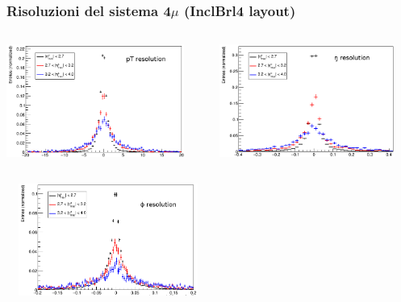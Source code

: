 \documentclass{beamer}
\begin{document}
\begin{frame}
\frametitle{Risoluzioni del sistema 4$\mu$ (InclBrl4 layout)}
\begin{columns}
\begin{column}{0.5\textwidth}
\centering
\includegraphics[width=\textwidth,height=3.7cm]{HZZ4mu/sigRecoPt}
\end{column}
\begin{column}{0.5\textwidth}
\centering
\includegraphics[width=\textwidth,height=3.7cm]{HZZ4mu/sigRecoEta}
\end{column}
\end{columns}
\vskip-0.5cm
\begin{center}
\centering
\includegraphics[width=0.5\textwidth,height=3.7cm]{HZZ4mu/sigRecoPhi}
\end{center}

\end{frame}


\end{document}
